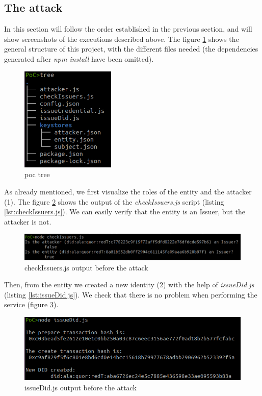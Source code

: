 \subsection{The attack}
In this section will follow the order established in the previous section, and will show screenshots of the executions described above. The figure \ref{fig:poc-tree} shows the general structure of this project, with the different files needed (the dependencies generated after \textit{npm install} have been omitted).\\
\begin{figure}[h]
    \centering
    \includegraphics[width=0.4\textwidth]{images/PoC/tree.png}
    \caption{\acrshort{poc} tree}
    \label{fig:poc-tree}
\end{figure}

As already mentioned, we first visualize the roles of the entity and the attacker (1). The figure \ref{fig:poc-1} shows the output of the \textit{checkIssuers.js} script (listing \ref{lst:checkIssuers.js}). We can easily verify that the entity is an Issuer, but the attacker is not.\\
\begin{figure}[h]
    \centering
    \includegraphics[width=1.0\textwidth]{images/PoC/1.png}
    \caption{checkIssuers.js output before the attack}
    \label{fig:poc-1}
\end{figure}

Then, from the entity we created a new identity (2) with the help of \textit{issueDid.js} (listing \ref{lst:issueDid.js}). We check that there is no problem when performing the service (figure \ref{fig:poc-2}).\\
\begin{figure}[h]
    \centering
    \includegraphics[width=1.0\textwidth]{images/PoC/2.png}
    \caption{issueDid.js output before the attack}
    \label{fig:poc-2}
\end{figure}

